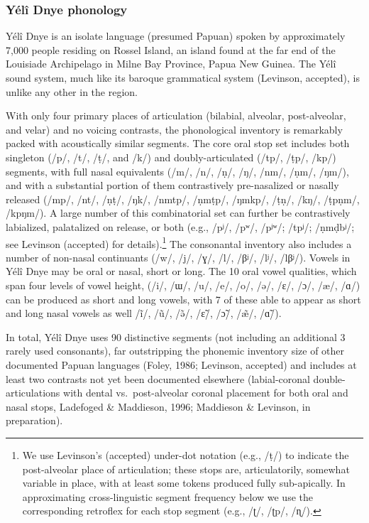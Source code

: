 \documentclass[english,,man,floatsintext]{apa6}
\begin{document}
\subsubsection{Yélî Dnye phonology}\label{yuxe9luxee-dnye-phonology}

Yélî Dnye is an isolate language (presumed Papuan) spoken by
approximately 7,000 people residing on Rossel Island, an island found at
the far end of the Louisiade Archipelago in Milne Bay Province, Papua
New Guinea. The Yélî sound system, much like its baroque grammatical
system (Levinson, accepted), is unlike any other in the region.

With only four primary places of articulation (bilabial, alveolar,
post-alveolar, and velar) and no voicing contrasts, the phonological
inventory is remarkably packed with acoustically similar segments. The
core oral stop set includes both singleton (/p/, /t/, /ṭ/, and /k/) and
doubly-articulated (/tp/, /ṭp/, /kp/) segments, with full nasal
equivalents (/m/, /n/, /ṇ/, /ŋ/, /nm/, /ṇm/, /ŋm/), and with a
substantial portion of them contrastively pre-nasalized or nasally
released (/mp/, /nt/, /ṇṭ/, /ŋk/, /nmtp/, /ṇmṭp/, /ŋmkp/, /ṭṇ/, /kŋ/,
/ṭpṇm/, /kpŋm/). A large number of this combinatorial set can further be
contrastively labialized, palatalized on release, or both (e.g., /pʲ/,
/pʷ/, /pʲʷ/; /tpʲ/; /ṇmḍbʲ/; see Levinson (accepted) for
details).\footnote{We use Levinson's (accepted) under-dot notation
  (e.g., /ṭ/) to indicate the post-alveolar place of articulation; these
  stops are, articulatorily, somewhat variable in place, with at least
  some tokens produced fully sub-apically. In approximating
  cross-linguistic segment frequency below we use the corresponding
  retroflex for each stop segment (e.g., /ʈ/, /ʈp/, /ɳ/).} The
consonantal inventory also includes a number of non-nasal continuants
(/w/, /j/, /ɣ/, /l/, /βʲ/, /lʲ/, /lβʲ/). Vowels in Yélî Dnye may be oral
or nasal, short or long. The 10 oral vowel qualities, which span four
levels of vowel height, (/i/, /ɯ/, /u/, /e/, /o/, /ə/, /ɛ/, /ɔ/, /æ/,
/ɑ/) can be produced as short and long vowels, with 7 of these able to
appear as short and long nasal vowels as well /ĩ/, /ũ/, /ə̃/, /ɛ̃/, /ɔ̃/,
/æ̃/, /ɑ̃/).

In total, Yélî Dnye uses 90 distinctive segments (not including an
additional 3 rarely used consonants), far outstripping the phonemic
inventory size of other documented Papuan languages (Foley, 1986;
Levinson, accepted) and includes at least two contrasts not yet been
documented elsewhere (labial-coronal double-articulations with dental
vs.~post-alveolar coronal placement for both oral and nasal stops,
Ladefoged \& Maddieson, 1996; Maddieson \& Levinson, in preparation).
\end{document}
